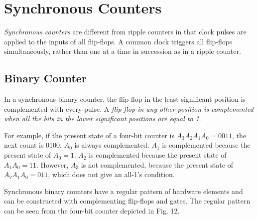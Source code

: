 \section{Synchronous Counters}
\label{sec:synchronous-counters}

\textit{Synchronous counters} are different from ripple counters in that clock pulses are applied to the inputs of all flip-flops. A common clock triggers all flip-flops simultaneously, rather than one at a time in succession as in a ripple counter.

\subsection{Binary Counter}
\label{subsec:binary-counter}

In a synchronous binary counter, the flip-flop in the least significant position is complemented with every pulse. A \textit{flip-flop in any other position is complemented when all the bits in the lower significant positions are equal to 1}. 

\noindent For example, if the present state of a four-bit counter is $A_3A_2A_1A_0 = 0011$, the next count is 0100. $A_0$ is always complemented. $A_1$ is complemented because the present state of $A_0 = 1$. $A_2$ is complemented because the present state of $A_1A_0 = 11$. However, $A_3$ is not complemented, because the present state of $A_2A_1A_0 = 011$, which does not give an all-1's condition.

Synchronous binary counters have a regular pattern of hardware elements and can be constructed with complementing flip-flops and gates. The regular pattern can be seen from the four-bit counter depicted in Fig. 12.

